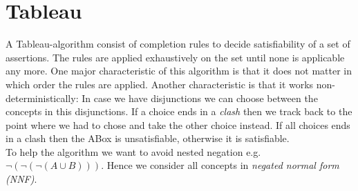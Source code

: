 \documentclass[a4paper,11pt]{scrartcl}
\theoremstyle{break}
\theoremstyle{definition}
\begin{document}
\section{Tableau}
A Tableau-algorithm consist of completion rules to decide satisfiability of a set of assertions. The rules are applied exhaustively on the set until none is applicable any more. One major characteristic of this algorithm is that it does not matter in which order the rules are applied. Another characteristic is that it works non-deterministically: In case we have disjunctions we can choose between the concepts in this disjunctions. If a choice ends in a \textit{clash} then we track back to the point where we had to chose and take the other choice instead. If all choices ends in a clash then the ABox is unsatisfiable, otherwise it is satisfiable.\\
To help the algorithm we want to avoid nested negation e.g. $\neg(\neg(\neg(A\cup B)))$. Hence we consider all concepts in \textit{negated normal form (NNF)}.
\end{document}

